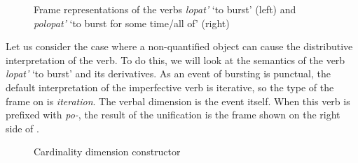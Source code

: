  \begin{figure}
\hfill{}
\hfill%
\hfill%
\caption{Frame representations of the verbs \textit{lopat'} `to burst' (left) and \textit{polopat'} `to burst for some time/all of' (right) \label{frame:lopat}}
\end{figure}
 
Let us consider the case where a non-quantified object can cause the distributive interpretation of the verb. To do this, we will look at the semantics of the verb \textit{lopat'} `to burst' and its derivatives. As an event of bursting is punctual, the default interpretation of the imperfective verb is iterative, so the type of the frame on  is \textit{iteration}. The verbal dimension is the event itself. When this verb is prefixed with \textit{po-}, the result of the unification is the frame shown on the right side of .

\begin{figure}
\small
{}
\hspace{1em}\normalsize%
\caption{Cardinality dimension constructor\label{constructor:cardinality}}
\end{figure}

